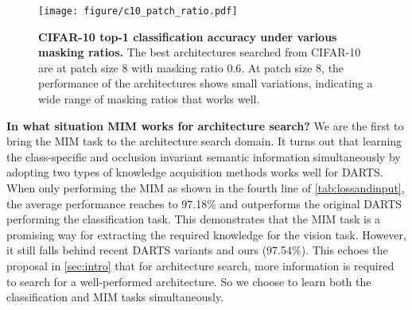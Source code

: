 \documentclass[10pt,twocolumn,letterpaper]{article}
\newcommand{\mypara}[1]{\vspace{1mm}\noindent\textbf{#1}}
\begin{document}
\begin{figure}[t]
  \centering
  \texttt{[image: figure/c10\_patch\_ratio.pdf]}
    \vspace{-6pt}
  \caption{\textbf{CIFAR-10 top-1 classification accuracy under various masking ratios.}
  The best architectures searched from CIFAR-10 are at patch size 8 with masking ratio 0.6.
  At patch size 8, the performance of the architectures shows small variations, indicating a wide range of masking ratios that works well.
  }
  \label{fig:c10_patch_ratio}
  \vspace{-6pt}
\end{figure}
 \begin{table}
  \centering
  \caption{\textbf{Ablations on key components.} \textbf{Cls.} denotes performing the classification task on CIFAR-10.
  Rec. denotes performing the clean image reconstruction task.
  mask denotes applying random masking following \cref{sec:2tasks}.}
  \vspace{-6pt}
  \small
  \label{tab:lossandinput}
  \vspace{-6pt}
\end{table} 
\mypara{In what situation MIM works for architecture search?}
We are the first to bring the MIM task to the architecture search domain.
It turns out that learning the class-specific and occlusion invariant semantic information simultaneously by adopting two types of knowledge acquisition methods works well for DARTS.
When only performing the MIM as shown in the fourth line of \cref{tab:lossandinput}, the average performance reaches to 97.18\% and outperforms the original DARTS performing the classification task.
This demonstrates that the MIM task is a promising way for extracting the required knowledge for the vision task.
However, it still falls behind recent DARTS variants and ours (97.54\%).
This echoes the proposal in \cref{sec:intro} that for architecture search, more information is required to search for a well-performed architecture.
So we choose to learn both the classification and MIM tasks simultaneously.
\end{document}
